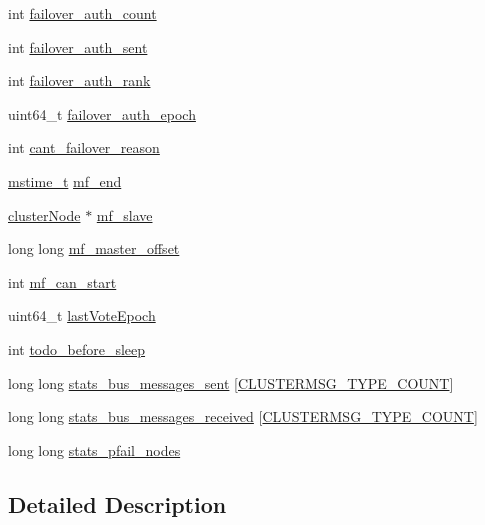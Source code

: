 \begin{DoxyCompactItemize}
\item 
int \hyperlink{structcluster_state_ae1b94f8bc49656245d7f3ed2a0582022}{failover\+\_\+auth\+\_\+count}
\item 
int \hyperlink{structcluster_state_adb3806b1c3d64d9cf5bbf5ceacf15dc0}{failover\+\_\+auth\+\_\+sent}
\item 
int \hyperlink{structcluster_state_a52dbd3d525c7f1e426d32f045893dd2e}{failover\+\_\+auth\+\_\+rank}
\item 
uint64\+\_\+t \hyperlink{structcluster_state_a516e3fdf8f127f6c29e318bcacbe2f3b}{failover\+\_\+auth\+\_\+epoch}
\item 
int \hyperlink{structcluster_state_a39e7055565db885db62edd0b431617ee}{cant\+\_\+failover\+\_\+reason}
\item 
\hyperlink{redismodule_8h_a652ae61e2475bc8957454534544968fc}{mstime\+\_\+t} \hyperlink{structcluster_state_a0c7b84fff1f0fe55132e97977fca4d9b}{mf\+\_\+end}
\item 
\hyperlink{structcluster_node}{cluster\+Node} $\ast$ \hyperlink{structcluster_state_a2e05a27830b3ab7c4abc4322c9972959}{mf\+\_\+slave}
\item 
long long \hyperlink{structcluster_state_a74633edfa88dbbd2ba5bd94e8d24bda8}{mf\+\_\+master\+\_\+offset}
\item 
int \hyperlink{structcluster_state_a2f5224c461c3af2a0833ae28c0ffa606}{mf\+\_\+can\+\_\+start}
\item 
uint64\+\_\+t \hyperlink{structcluster_state_ad9df5e1c1e5db0bb0334f30de0b4a815}{last\+Vote\+Epoch}
\item 
int \hyperlink{structcluster_state_ad1fa0188f945aac48dec9eb49c943a72}{todo\+\_\+before\+\_\+sleep}
\item 
long long \hyperlink{structcluster_state_a8b47b0756931e1e5dc07cda92de394e2}{stats\+\_\+bus\+\_\+messages\+\_\+sent} \mbox{[}\hyperlink{cluster_8h_a6222c464c1f2125f42271d2abd63853e}{C\+L\+U\+S\+T\+E\+R\+M\+S\+G\+\_\+\+T\+Y\+P\+E\+\_\+\+C\+O\+U\+NT}\mbox{]}
\item 
long long \hyperlink{structcluster_state_ad3dc0c6e15b6bd97620150b94d2f6c44}{stats\+\_\+bus\+\_\+messages\+\_\+received} \mbox{[}\hyperlink{cluster_8h_a6222c464c1f2125f42271d2abd63853e}{C\+L\+U\+S\+T\+E\+R\+M\+S\+G\+\_\+\+T\+Y\+P\+E\+\_\+\+C\+O\+U\+NT}\mbox{]}
\item 
long long \hyperlink{structcluster_state_a278d5ed382c852a1e40e985d642306e6}{stats\+\_\+pfail\+\_\+nodes}
\end{DoxyCompactItemize}


\subsection{Detailed Description}


